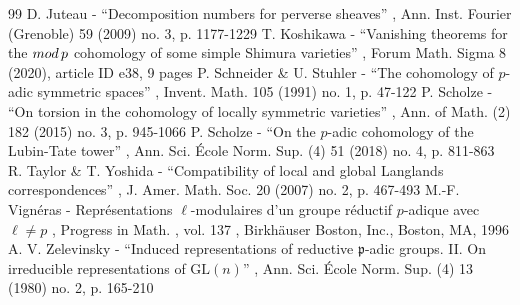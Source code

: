 \documentclass[11pt]{article}
\theoremstyle{plain}
\theoremstyle{definition}
\numberwithin{equation}{subsection}
\begin{document}
\begin{thebibliography}{99}
 D. Juteau - “Decomposition numbers for perverse sheaves” , Ann. Inst. Fourier (Grenoble) 59 (2009) no. 3, p. 1177-1229
 T. Koshikawa - “Vanishing theorems for the ${\rm mod}\,p$ cohomology of some simple Shimura varieties” , Forum Math. Sigma 8 (2020), article ID e38, 9 pages
 P. Schneider \& U. Stuhler - “The cohomology of $p$-adic symmetric spaces” , Invent. Math. 105 (1991) no. 1, p. 47-122
 P. Scholze - “On torsion in the cohomology of locally symmetric varieties” , Ann. of Math. (2) 182 (2015) no. 3, p. 945-1066
 P. Scholze - “On the $p$-adic cohomology of the Lubin-Tate tower” , Ann. Sci. École Norm. Sup. (4) 51 (2018) no. 4, p. 811-863
 R. Taylor \& T. Yoshida - “Compatibility of local and global Langlands correspondences” , J. Amer. Math. Soc. 20 (2007) no. 2, p. 467-493
 M.-F. Vignéras - Représentations $\ell $-modulaires d’un groupe réductif $p$-adique avec $\ell \ne p$ , Progress in Math. , vol. 137 , Birkhäuser Boston, Inc., Boston, MA, 1996
 A. V. Zelevinsky - “Induced representations of reductive ${\mathfrak{p}}$-adic groups. II. On irreducible representations of $\mathrm{GL}(n)$” , Ann. Sci. École Norm. Sup. (4) 13 (1980) no. 2, p. 165-210
\end{thebibliography}
\end{document}
